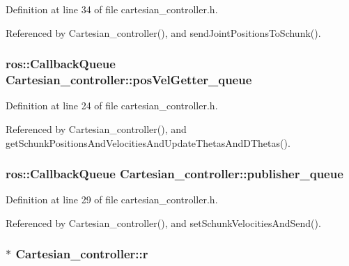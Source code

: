 Definition at line 34 of file cartesian\-\_\-controller.\-h.



Referenced by Cartesian\-\_\-controller(), and send\-Joint\-Positions\-To\-Schunk().

\hypertarget{classCartesian__controller_a144c7faad45f3d070624452c1f02ba15}{
\subsubsection[{pos\-Vel\-Getter\-\_\-queue}]{\setlength{\rightskip}{0pt plus 5cm}ros\-::\-Callback\-Queue Cartesian\-\_\-controller\-::pos\-Vel\-Getter\-\_\-queue\hspace{0.3cm}{\ttfamily [protected]}}}\label{classCartesian__controller_a144c7faad45f3d070624452c1f02ba15}


Definition at line 24 of file cartesian\-\_\-controller.\-h.



Referenced by Cartesian\-\_\-controller(), and get\-Schunk\-Positions\-And\-Velocities\-And\-Update\-Thetas\-And\-D\-Thetas().

\hypertarget{classCartesian__controller_a041a2eb6657c9b036a512fb21e9f5086}{
\subsubsection[{publisher\-\_\-queue}]{\setlength{\rightskip}{0pt plus 5cm}ros\-::\-Callback\-Queue Cartesian\-\_\-controller\-::publisher\-\_\-queue\hspace{0.3cm}{\ttfamily [protected]}}}\label{classCartesian__controller_a041a2eb6657c9b036a512fb21e9f5086}


Definition at line 29 of file cartesian\-\_\-controller.\-h.



Referenced by Cartesian\-\_\-controller(), and set\-Schunk\-Velocities\-And\-Send().

\hypertarget{classCartesian__controller_a5562129951bd802e4ded77fc716c87a0}{
\subsubsection[{r}]{$\ast$ Cartesian\-\_\-controller\-::r}}\label{classCartesian__controller_a5562129951bd802e4ded77fc716c87a0}


